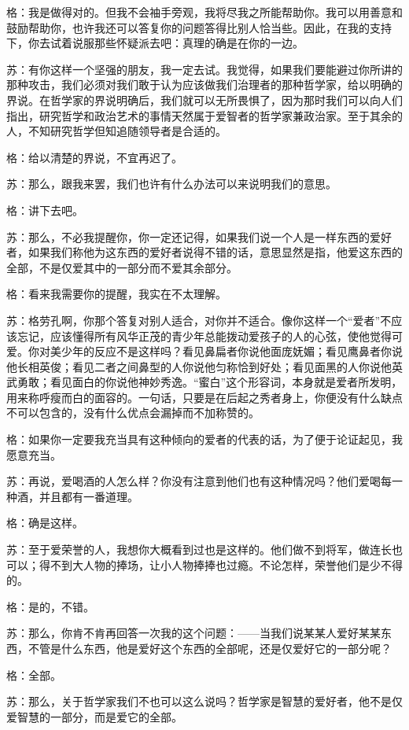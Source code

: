 \documentclass[12pt,oneside]{book}
\begin{document}
格：我是做得对的。但我不会袖手旁观，我将尽我之所能帮助你。我可以用善意和鼓励帮助你，也许我还可以答复你的问题答得比别人恰当些。因此，在我的支持下，你去试着说服那些怀疑派去吧：真理的确是在你的一边。

苏：有你这样一个坚强的朋友，我一定去试。我觉得，如果我们要能避过你所讲的那种攻击，我们必须对我们敢于认为应该做我们治理者的那种哲学家，给以明确的界说。在哲学家的界说明确后，我们就可以无所畏惧了，因为那时我们可以向人们指出，研究哲学和政治艺术的事情天然属于爱智者的哲学家兼政治家。至于其余的人，不知研究哲学但知追随领导者是合适的。

格：给以清楚的界说，不宜再迟了。

苏：那么，跟我来罢，我们也许有什么办法可以来说明我们的意思。

格：讲下去吧。

苏：那么，不必我提醒你，你一定还记得，如果我们说一个人是一样东西的爱好者，如果我们称他为这东西的爱好者说得不错的话，意思显然是指，他爱这东西的全部，不是仅爱其中的一部分而不爱其余部分。

格：看来我需要你的提醒，我实在不太理解。

苏：格劳孔啊，你那个答复对别人适合，对你并不适合。像你这样一个“爱者”不应该忘记，应该懂得所有风华正茂的青少年总能拨动爱孩子的人的心弦，使他觉得可爱。你对美少年的反应不是这样吗？看见鼻扁者你说他面庞妩媚；看见鹰鼻者你说他长相英俊；看见二者之间鼻型的人你说他匀称恰到好处；看见面黑的人你说他英武勇敢；看见面白的你说他神妙秀逸。“蜜白”这个形容词，本身就是爱者所发明，用来称呼瘦而白的面容的。一句话，只要是在后起之秀者身上，你便没有什么缺点不可以包含的，没有什么优点会漏掉而不加称赞的。

格：如果你一定要我充当具有这种倾向的爱者的代表的话，为了便于论证起见，我愿意充当。

苏：再说，爱喝酒的人怎么样？你没有注意到他们也有这种情况吗？他们爱喝每一种酒，并且都有一番道理。

格：确是这样。

苏：至于爱荣誉的人，我想你大概看到过也是这样的。他们做不到将军，做连长也可以；得不到大人物的捧场，让小人物捧捧也过瘾。不论怎样，荣誉他们是少不得的。

格：是的，不错。

苏：那么，你肯不肯再回答一次我的这个问题：——当我们说某某人爱好某某东西，不管是什么东西，他是爱好这个东西的全部呢，还是仅爱好它的一部分呢？

格：全部。

苏：那么，关于哲学家我们不也可以这么说吗？哲学家是智慧的爱好者，他不是仅爱智慧的一部分，而是爱它的全部。
\end{document}
